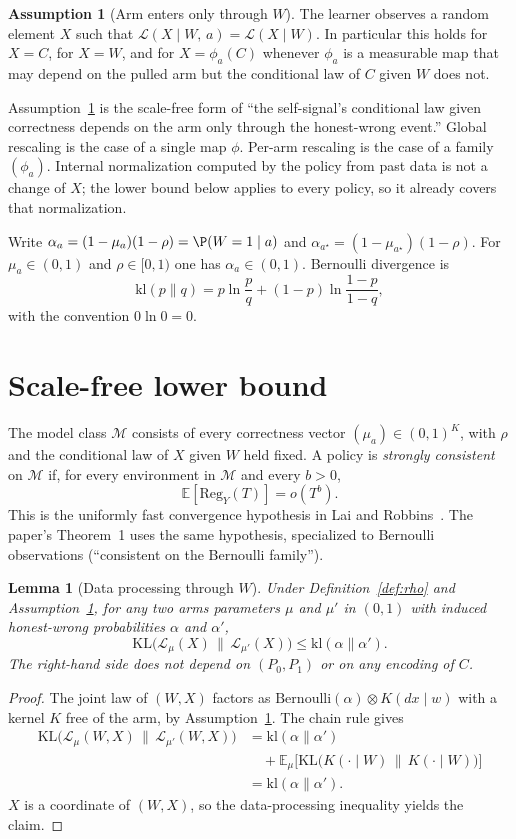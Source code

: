 \documentclass{article}
\newtheorem{lemma}[theorem]{Lemma}
\theoremstyle{definition}
\newtheorem{assumption}[theorem]{Assumption}
\theoremstyle{remark}
\newcommand{\E}{\mathbb{E}}
\newcommand{\kl}{\mathrm{kl}}
\newcommand{\KL}{\mathrm{KL}}
\newcommand{\Reg}{\mathrm{Reg}}
\begin{document}
\begin{assumption}[Arm enters only through $W$]\label{ass:channel}
The learner observes a random element $X$ such that $\mathcal L(X\mid W,\,a)=\mathcal L(X\mid W)$. In particular this holds for $X=C$, for $X=W$, and for $X=\phi_a(C)$ whenever $\phi_a$ is a measurable map that may depend on the pulled arm but the conditional law of $C$ given $W$ does not.
\end{assumption}

Assumption~\ref{ass:channel} is the scale-free form of ``the self-signal's conditional law given correctness depends on the arm only through the honest-wrong event.'' Global rescaling is the case of a single map $\phi$. Per-arm rescaling is the case of a family $(\phi_a)$. Internal normalization computed by the policy from past data is not a change of $X$; the lower bound below applies to every policy, so it already covers that normalization.

Write $\alpha_a=(1-\mu_a)(1-\rho)=\P(W=1\mid a)$ and $\alpha_{a^\star}=(1-\mu_{a^\star})(1-\rho)$. For $\mu_a\in(0,1)$ and $\rho\in[0,1)$ one has $\alpha_a\in(0,1)$. Bernoulli divergence is
\[
\kl(p\|q)=p\ln\frac{p}{q}+(1-p)\ln\frac{1-p}{1-q},
\]
with the convention $0\ln 0=0$.

\section{Scale-free lower bound}
The model class $\mathcal M$ consists of every correctness vector $(\mu_a)\in(0,1)^K$, with $\rho$ and the conditional law of $X$ given $W$ held fixed. A policy is \emph{strongly consistent} on $\mathcal M$ if, for every environment in $\mathcal M$ and every $b>0$,
\[
\E[\Reg_Y(T)]=o(T^b).
\]
This is the uniformly fast convergence hypothesis in Lai and Robbins~\cite{lai1985}. The paper's Theorem~1 uses the same hypothesis, specialized to Bernoulli observations (``consistent on the Bernoulli family'').

\begin{lemma}[Data processing through $W$]\label{lem:dpi}
Under Definition~\ref{def:rho} and Assumption~\ref{ass:channel}, for any two arms parameters $\mu$ and $\mu'$ in $(0,1)$ with induced honest-wrong probabilities $\alpha$ and $\alpha'$,
\[
\KL\!\big(\mathcal L_\mu(X)\,\|\,\mathcal L_{\mu'}(X)\big)
\le\kl(\alpha\|\alpha').
\]
The right-hand side does not depend on $(P_0,P_1)$ or on any encoding of $C$.
\end{lemma}

\begin{proof}
The joint law of $(W,X)$ factors as $\mathrm{Bernoulli}(\alpha)\otimes K(dx\mid w)$ with a kernel $K$ free of the arm, by Assumption~\ref{ass:channel}. The chain rule gives
\begin{align*}
\KL\!\big(\mathcal L_\mu(W,X)\,\|\,\mathcal L_{\mu'}(W,X)\big)
&=\kl(\alpha\|\alpha')\\
&\quad+\E_{\mu}\big[\KL\big(K(\cdot\mid W)\,\|\,K(\cdot\mid W)\big)\big]\\
&=\kl(\alpha\|\alpha').
\end{align*}
$X$ is a coordinate of $(W,X)$, so the data-processing inequality yields the claim.
\end{proof}
\end{document}

